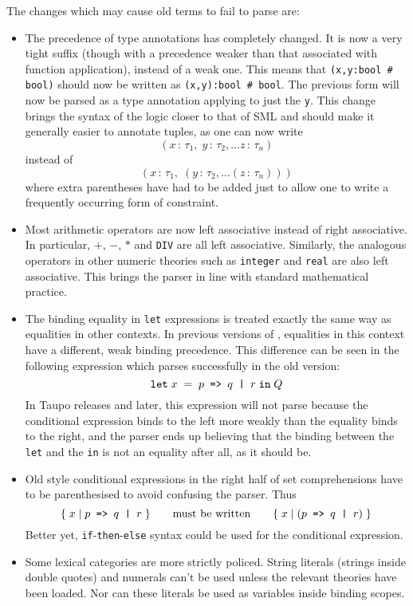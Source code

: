 The changes which may cause old terms to fail to parse are:
\begin{itemize}
\newcommand\condexp{\holtxt{$p$ => $q$ | $r$}}
\item The precedence of type annotations has completely changed.  It
  is now a very tight suffix (though with a precedence weaker than
  that associated with function application), instead of a weak one.
  This means that \mbox{\tt (x,y:bool \# bool)} should now be written
  as \mbox{\tt (x,y):bool \# bool}. The previous form will now be
  parsed as a type annotation applying to just the \verb+y+.  This
  change brings the syntax of the logic closer to that of SML and
  should make it generally easier to annotate tuples, as one can now
  write \[ (x\,:\,\tau_1,\;y\,:\,\tau_2,\dots z\,:\,\tau_n)
  \] instead of \[
  (x\,:\,\tau_1, \;(y\,:\,\tau_2, \dots (z\,:\,\tau_n)))
  \] where extra parentheses have had to be added just to allow one to
  write a frequently occurring form of constraint.
\item Most arithmetic operators are now left associative instead of
  right associative.  In particular, $+$, $-$, $*$ and {\tt DIV} are
  all left associative.  Similarly, the analogous operators in other
  numeric theories such as {\tt integer} and {\tt real} are also left
  associative.  This brings the \HOL{} parser in line with standard
  mathematical practice.
\item The binding equality in {\tt let} expressions is treated exactly
  the same way as equalities in other contexts.  In previous versions
  of \HOL, equalities in this context have a different, weak binding
  precedence.  This difference can be seen in the following expression
  which parses successfully in the old version:
  \[ {\tt let} \; x \; = \; \condexp \; {\tt
  in} \;Q \] In Taupo releases and later, this expression will not
  parse because the conditional expression binds to the left more
  weakly than the equality binds to the right, and the parser ends up
  believing that the binding between the \verb+let+ and the \verb+in+
  is not an equality after all, as it should be.
\item Old style conditional expressions in the right half of set
  comprehensions have to be parenthesised to avoid confusing the
  parser.  Thus \[
  \{ \; x \; | \; \condexp \; \}
   \qquad\mbox{must be written} \qquad
  \{ \; x \; | \; (\condexp) \; \}
  \] Better yet, {\tt if}-{\tt then}-{\tt else} syntax could be used
  for the conditional expression.
\item Some lexical categories are more strictly policed.  String
  literals (strings inside double quotes) and numerals can't be used
  unless the relevant theories have been loaded.  Nor can these
  literals be used as variables inside binding scopes.
\end{itemize}


